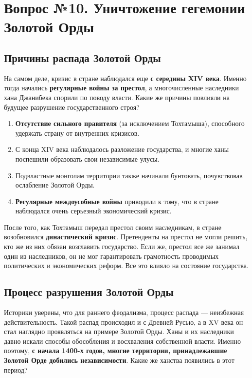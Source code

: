 \documentclass{article}
\begin{document}
\pagebreak
\section{Вопрос №10. Уничтожение гегемонии Золотой Орды}

\subsection{Причины распада Золотой Орды}

На самом деле, кризис в стране наблюдался еще \textbf{с середины XIV века}. Именно тогда начались \textbf{регулярные войны за престол}, а многочисленные наследники хана Джанибека спорили по поводу власти. Какие же причины повлияли на будущее разрушение государственного строя? 

\begin{enumerate}
    \item \textbf{Отсутствие сильного правителя} (за исключением Тохтамыша), способного удержать страну от внутренних кризисов.
    \item С конца XIV века наблюдалось разложение государства, и многие ханы поспешили образовать свои независимые улусы.
    \item Подвластные монголам территории также начинали бунтовать, почувствовав ослабление Золотой Орды.
    \item \textbf{Регулярные междоусобные войны} приводили к тому, что в стране наблюдался очень серьезный экономический кризис.
\end{enumerate}

После того, как Тохтамыш передал престол своим наследникам, в стране возобновился \textbf{династический кризис}. Претенденты на престол не могли решить, кто же из них обязан возглавить государство. Если же, престол все же занимал один из наследников, он не мог гарантировать грамотность проводимых политических и экономических реформ. Все это влияло на состояние государства.

\subsection{Процесс разрушения Золотой Орды}

Историки уверены, что для раннего феодализма, процесс распада — неизбежная действительность. Такой распад происходил и с Древней Русью, а в XV века он стал наглядно проявляться на примере Золотой Орды. Ханы и их наследники давно искали способы обособления и восхваления собственной власти. Именно поэтому, \textbf{с начала 1400-х годов, многие территории, принадлежавшие Золотой Орде добились независимости}. Какие же ханства появились в этот период? 
\end{document}
